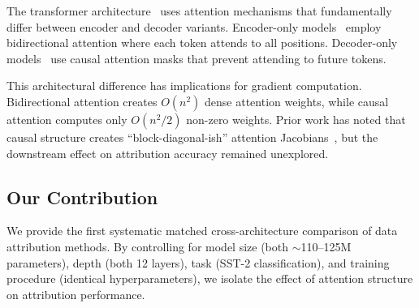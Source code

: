 The transformer architecture~\cite{vaswani2017attention} uses attention mechanisms that fundamentally differ between encoder and decoder variants. Encoder-only models~\cite{devlin2019bert} employ bidirectional attention where each token attends to all positions. Decoder-only models~\cite{radford2019language} use causal attention masks that prevent attending to future tokens.

This architectural difference has implications for gradient computation. Bidirectional attention creates $O(n^2)$ dense attention weights, while causal attention computes only $O(n^2/2)$ non-zero weights. Prior work has noted that causal structure creates ``block-diagonal-ish'' attention Jacobians~\cite{grosse2023studying}, but the downstream effect on attribution accuracy remained unexplored.

\subsection{Our Contribution}

We provide the first systematic matched cross-architecture comparison of data attribution methods. By controlling for model size (both $\sim$110--125M parameters), depth (both 12 layers), task (SST-2 classification), and training procedure (identical hyperparameters), we isolate the effect of attention structure on attribution performance.
